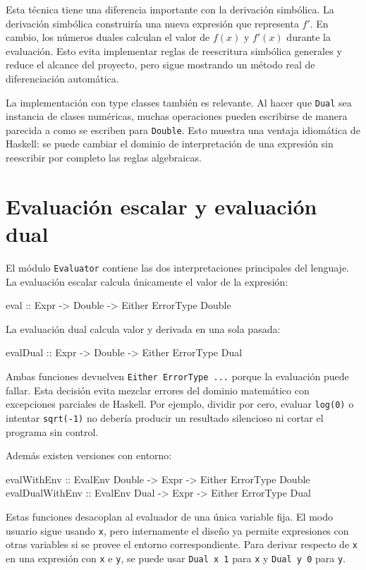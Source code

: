 \documentclass[11pt,a4paper]{article}
\newenvironment{lstlisting}{\verbatim}{\endverbatim}
\begin{document}
Esta técnica tiene una diferencia importante con la derivación simbólica. La derivación simbólica construiría una nueva expresión que representa \(f'\). En cambio, los números duales calculan el valor de \(f(x)\) y \(f'(x)\) durante la evaluación. Esto evita implementar reglas de reescritura simbólica generales y reduce el alcance del proyecto, pero sigue mostrando un método real de diferenciación automática.

La implementación con type classes también es relevante. Al hacer que \texttt{Dual} sea instancia de clases numéricas, muchas operaciones pueden escribirse de manera parecida a como se escriben para \texttt{Double}. Esto muestra una ventaja idiomática de Haskell: se puede cambiar el dominio de interpretación de una expresión sin reescribir por completo las reglas algebraicas.

\section{Evaluación escalar y evaluación dual}

El módulo \texttt{Evaluator} contiene las dos interpretaciones principales del lenguaje. La evaluación escalar calcula únicamente el valor de la expresión:

\begin{lstlisting}
eval :: Expr -> Double -> Either ErrorType Double
\end{lstlisting}

La evaluación dual calcula valor y derivada en una sola pasada:

\begin{lstlisting}
evalDual :: Expr -> Double -> Either ErrorType Dual
\end{lstlisting}

Ambas funciones devuelven \texttt{Either ErrorType ...} porque la evaluación puede fallar. Esta decisión evita mezclar errores del dominio matemático con excepciones parciales de Haskell. Por ejemplo, dividir por cero, evaluar \texttt{log(0)} o intentar \texttt{sqrt(-1)} no debería producir un resultado silencioso ni cortar el programa sin control.

Además existen versiones con entorno:

\begin{lstlisting}
evalWithEnv :: EvalEnv Double -> Expr -> Either ErrorType Double
evalDualWithEnv :: EvalEnv Dual -> Expr -> Either ErrorType Dual
\end{lstlisting}

Estas funciones desacoplan al evaluador de una única variable fija. El modo usuario sigue usando \texttt{x}, pero internamente el diseño ya permite expresiones con otras variables si se provee el entorno correspondiente. Para derivar respecto de \texttt{x} en una expresión con \texttt{x} e \texttt{y}, se puede usar \texttt{Dual x 1} para \texttt{x} y \texttt{Dual y 0} para \texttt{y}.
\end{document}
